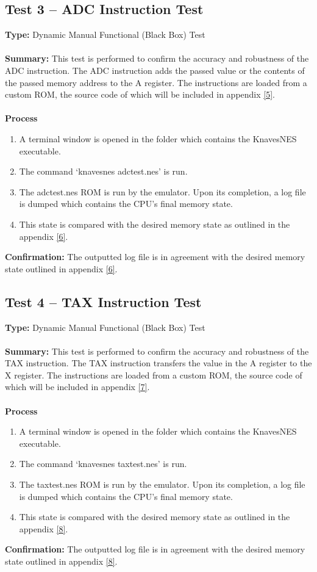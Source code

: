 \documentclass[12pt]{article}
\begin{document}
	\subsection{Test 3 – ADC Instruction Test}
		\textbf{Type: } Dynamic Manual Functional (Black Box) Test\\\\
		\textbf{Summary: } This test is performed to confirm the accuracy and robustness of the ADC instruction. The ADC instruction adds the passed value or the contents of the passed memory address to the A register. The instructions are loaded from a custom ROM, the source code of which will be included in appendix \hyperlink{appendix}{[5]}.\\\\
		\textbf{Process}
			\begin{enumerate}
				\item A terminal window is opened in the folder which contains the KnavesNES executable.
				\item The command ‘knavesnes adctest.nes’ is run.
				\item The adctest.nes ROM is run by the emulator. Upon its completion, a log file is dumped which contains the CPU’s final memory state.
				\item This state is compared with the desired memory state as outlined in the appendix \hyperlink{appendix}{[6]}.
			\end{enumerate}
		\textbf{Confirmation: }The outputted log file is in agreement with the desired memory state outlined in appendix \hyperlink{appendix}{[6]}.
	\subsection{Test 4 – TAX Instruction Test}
		\textbf{Type: } Dynamic Manual Functional (Black Box) Test\\\\
		\textbf{Summary: } This test is performed to confirm the accuracy and robustness of the TAX instruction. The TAX instruction transfers the value in the A register to the X register. The instructions are loaded from a custom ROM, the source code of which will be included in appendix \hyperlink{appendix}{[7]}.\\\\
		\textbf{Process}
			\begin{enumerate}
				\item A terminal window is opened in the folder which contains the KnavesNES executable.
				\item The command ‘knavesnes taxtest.nes’ is run.
				\item The taxtest.nes ROM is run by the emulator. Upon its completion, a log file is dumped which contains the CPU’s final memory state.
				\item This state is compared with the desired memory state as outlined in the appendix \hyperlink{appendix}{[8]}.
			\end{enumerate}
		\textbf{Confirmation: } The outputted log file is in agreement with the desired memory state outlined in appendix \hyperlink{appendix}{[8]}.
\end{document}
